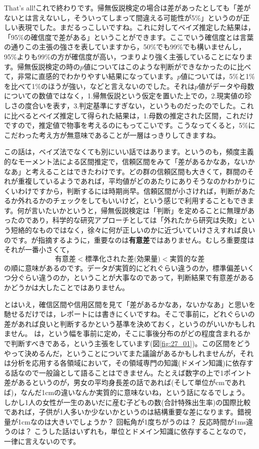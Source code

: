\documentclass{ltjbook}
\begin{document}
That's all!これで終わりです。帰無仮説検定の場合は差があったとしても「差がないとは言えないし，そういってしまって間違える可能性が5\%」というのが正しい表現でした。まだるっこしいですね。これに対してベイズ推定した結果は，「95\%の確信度で差がある」ということができます。ここでいう確信度とは言葉の通りこの主張の強さを表していますから，50\%でも99\%でも構いませんし，95\%よりも99\%の方が確信度が高い，つまりより強く主張していることになります。帰無仮説検定の時の$p$値についてはこのような判断ができなかったのに比べて，非常に直感的でわかりやすい結果になっています。$p$値については，5\%と1\% を比べて1\%のほうが強い，などと言えないのでした。それは$p$値がデータや母数についての数値ではなく，1.帰無仮説という仮定を置いた上での，2.現実値の珍しさの度合いを表す，3.判定基準にすぎない，というものだったのでした。これに比べるとベイズ推定して得られた結果は，1.母数の推定された区間，これだけですので，推定値で物事を考えるのにもってこいです。こうなってくると，5\%にこだわった考え方が無意味であることが一層はっきりしてきますね。

この話は，ベイズ法でなくても別にいい話ではあります。というのも，頻度主義的なモーメント法による区間推定で，信頼区間をみて「差があるかなあ，ないかなあ」と考えることはできたわけです。どの群の信頼区間も大きくて，群間のそれが重複しているようであれば，平均値がどのあたりにありそうなのかわかりにくいわけですから，判断するには時期尚早。信頼区間が小さければ，判断があたるか外れるかのチェックをしてもいいけど，という感じで利用することもできます。何が言いたいかというと，帰無仮説検定は「判断」を定めることに無理があったのであり，科学的な研究アプローチとしては「外れたから研究は失敗」という短絡的なものではなく，徐々に何が正しいのかに近づいていけさえすれば良いのです。\textcite{Toyoda2009}が指摘するように，重要なのは\textbf{有意差}ではありません。むしろ重要度はそれが一番小さくて，
\[ \mbox{有意差} < \mbox{標準化された差(効果量)} < \mbox{実質的な差} \]
の順に意味があるのです。データが実質的にどれぐらい違うのか，標準偏差いくつ分ぐらい違うのか，ということが大事なのであって，判断結果で有意差があるかどうかは大したことではありません。

とはいえ，確信区間や信用区間を見て「差があるかなあ，ないかなあ」と思いを馳せるだけでは，レポートには書きにくいですね。そこで事前に，どれぐらいの差があれば良いと判断するかという基準を決めておく，というのがいいかもしれません。
\textcite{kruschke2018rejecting}は，という幅を事前に定め，そこに事後分布のがどの程度含まれるかで判断すべきである，という主張をしています(図\ref{fig:27_01})。この区間をどうやって決めるんだ，ということについてまた議論があるかもしれませんが，それは分析を応用する各領域において，その領域専門の知識(ドメイン知識)に依存する話なので一般論として語ることはできません。たとえば数字の上で1ポイント差があるというのが，男女の平均身長差の話であれば(そして単位がcmであれば)，なんだ1cmの違いなんか実質的に意味ないね，という話になるでしょう。しかし1人の女性が一生のあいだに産む子どもの数(合計特殊出生率)の国際比較であれば，子供が1人多いか少ないかというのは結構重要な差になります。錯視量が1cmなのは大きいでしょうか？ 回転角が1度ちがうのは？ 反応時間が1ms違うのは？ こうした話はいずれも，単位とドメイン知識に依存することなので，一律に言えないのです。
\end{document}
